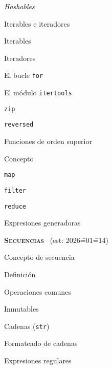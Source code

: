 \begin{longenum}
\begin{longenum}
\begin{longenum}
            \item \textit{Hashables}
        \end{longenum}
        \item Iterables e iteradores
        \begin{longenum}
            \item Iterables
            \item Iteradores
            \begin{longenum}
                \item El bucle \texttt{for}
                \item El módulo \texttt{itertools}
                \item \texttt{zip}
                \item \texttt{reversed}
            \end{longenum}
        \end{longenum}
        \item Funciones de orden superior
        \begin{longenum}
            \item Concepto
            \item \texttt{map}
            \item \texttt{filter}
            \item \texttt{reduce}
            \item Expresiones generadoras
        \end{longenum}
    \end{longenum}
    \item \textbf{\textsc{Secuencias}} \ (est: 2026\==01\==14)
    \begin{longenum}
        \item Concepto de secuencia
        \begin{longenum}
            \item Definición
            \item Operaciones comunes
        \end{longenum}
        \item Inmutables
        \begin{longenum}
            \item Cadenas (\texttt{str})
            \begin{longenum}
                \item Formateado de cadenas
                \item Expresiones regulares
            \end{longenum}

\end{longenum}
\end{longenum}
\end{longenum}
